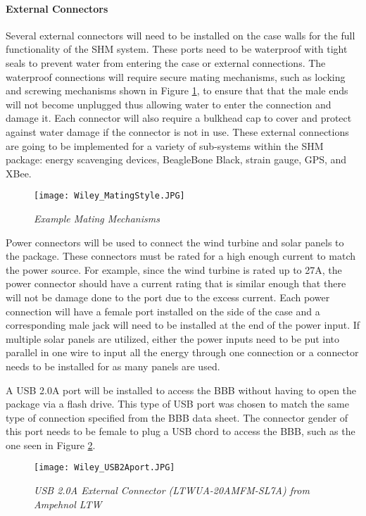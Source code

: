 \paragraph{External Connectors} 
Several external connectors will need to be installed on the case walls for the full functionality of the SHM system. These ports need to be waterproof
with tight seals to prevent water from entering the case or external connections. The waterproof connections will require secure mating mechanisms, such
as locking and screwing mechanisms shown in Figure \ref{fig:BowChicaWowWow}, to ensure that that the male ends will not become unplugged thus allowing
water to enter the connection and damage it. Each connector will also require a bulkhead cap to cover and protect against water damage if the
connector is not in use. These external connections are going to be implemented for a variety of sub-systems within the SHM package: energy
scavenging devices, BeagleBone Black, strain gauge, GPS, and XBee.
\begin{figure}[h]
\centering
\texttt{[image: Wiley\_MatingStyle.JPG]}
\caption{\textit{Example Mating Mechanisms}}
\label{fig:BowChicaWowWow}
\end{figure}

Power connectors will be used to connect the wind turbine and solar panels to the package. These connectors must be rated for a high enough current to
match the power source. For example, since the wind turbine is rated up to 27A, the power connector should have a current rating that is similar enough
that there will not be damage done to the port due to the excess current. Each power connection will have a female port installed on the side of the
case and a corresponding male jack will need to be installed at the end of the power input. If multiple solar panels are utilized, either the power
inputs need to be put into parallel in one wire to input all the energy through one connection or a connector needs to be installed for as many panels
are used. 

A USB 2.0A port will be installed to access the BBB without having to open the package via a flash drive. This type of USB port was chosen to match the
same type of connection specified from the BBB data sheet. The connector gender of this port needs to be female to plug a USB chord to access the BBB,
such as the one seen in Figure \ref{fig:USB}. 
\begin{figure}[h]
\centering
\texttt{[image: Wiley\_USB2Aport.JPG]}
\caption{\textit{USB 2.0A External Connector (LTWUA-20AMFM-SL7A) from Ampehnol LTW}}
\label{fig:USB}
\end{figure}

